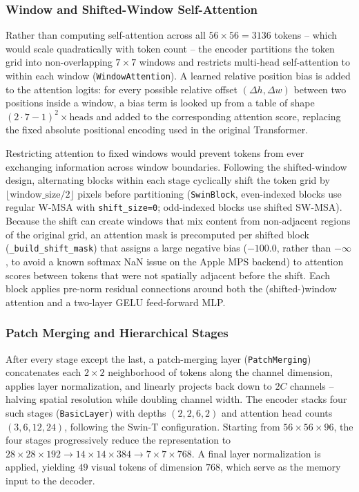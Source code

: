 \documentclass[conference]{IEEEtran}
\begin{document}
\subsubsection{Window and Shifted-Window Self-Attention}
Rather than computing self-attention across all $56\times56=3136$ tokens -- which would scale quadratically with token count -- the encoder partitions the token grid into non-overlapping $7\times7$ windows and restricts multi-head self-attention to within each window (\texttt{WindowAttention}). A learned relative position bias is added to the attention logits: for every possible relative offset $(\Delta h, \Delta w)$ between two positions inside a window, a bias term is looked up from a table of shape $(2\cdot7-1)^2 \times \text{heads}$ and added to the corresponding attention score, replacing the fixed absolute positional encoding used in the original Transformer.

Restricting attention to fixed windows would prevent tokens from ever exchanging information across window boundaries. Following the shifted-window design, alternating blocks within each stage cyclically shift the token grid by $\lfloor \text{window\_size}/2 \rfloor$ pixels before partitioning (\texttt{SwinBlock}, even-indexed blocks use regular W-MSA with \texttt{shift\_size=0}; odd-indexed blocks use shifted SW-MSA). Because the shift can create windows that mix content from non-adjacent regions of the original grid, an attention mask is precomputed per shifted block (\texttt{\_build\_shift\_mask}) that assigns a large negative bias ($-100.0$, rather than $-\infty$, to avoid a known softmax NaN issue on the Apple MPS backend) to attention scores between tokens that were not spatially adjacent before the shift. Each block applies pre-norm residual connections around both the (shifted-)window attention and a two-layer GELU feed-forward MLP.

\subsubsection{Patch Merging and Hierarchical Stages}
After every stage except the last, a patch-merging layer (\texttt{PatchMerging}) concatenates each $2\times2$ neighborhood of tokens along the channel dimension, applies layer normalization, and linearly projects back down to $2C$ channels -- halving spatial resolution while doubling channel width. The encoder stacks four such stages (\texttt{BasicLayer}) with depths $(2,2,6,2)$ and attention head counts $(3,6,12,24)$, following the Swin-T configuration. Starting from $56\times56\times96$, the four stages progressively reduce the representation to $28\times28\times192 \rightarrow 14\times14\times384 \rightarrow 7\times7\times768$. A final layer normalization is applied, yielding $49$ visual tokens of dimension $768$, which serve as the memory input to the decoder.
\end{document}

